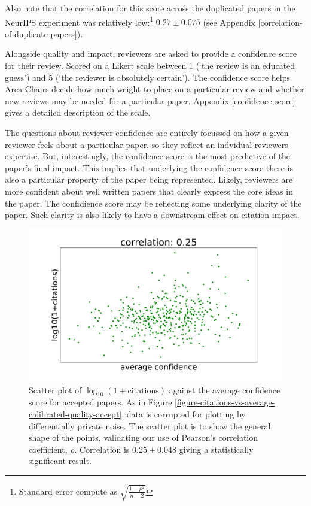 \documentclass[twoside]{article}
\begin{document}
Also note that the correlation for this score across the duplicated papers in the NeurIPS experiment was relatively low:\footnote{Standard error compute as $\sqrt{\frac{1-\rho^2}{n-2}}$} $0.27 \pm 0.075$ (see Appendix \ref{correlation-of-duplicate-papers}).

Alongside quality and impact, reviewers are asked to provide a confidence score for their review. Scored on a Likert scale between 1 (`the review is an educated guess') and 5 (`the reviewer is absolutely certain'). The confidence score helps Area Chairs decide how much weight to place on a particular review and whether new reviews may be needed for a particular paper. Appendix \ref{confidence-score} gives a detailed description of the scale.  

The questions about reviewer confidence are entirely focussed on how a given reviewer feels about a particular paper, so they reflect an indvidual reviewers expertise. But, interestingly, the confidence score is the most predictive of the paper's final impact. This implies that underlying the confidence score there is also a particular property of the paper being represented. Likely, reviewers are more confident about well written papers that clearly express the core ideas in the paper. The confidience score may be reflecting some underlying clarity of the paper. Such clarity is also likely to have a downstream effect on citation impact.

\begin{figure}[htb]
\includegraphics[width=0.9\columnwidth]{diagrams/neurips/citations-vs-average-confidence-accept.pdf}


\caption{Scatter plot of $\log_{10}(1+\text{citations})$ against the average confidence score for accepted papers. As in Figure \ref{figure-citations-vs-average-calibrated-quality-accept}, data is corrupted for plotting by differentially private noise. The scatter plot is to show the general shape of the points, validating our use of Pearson's correlation coefficient, $\rho$. Correlation is $0.25 \pm 0.048$ giving a statistically significant result.}
\label{figure-citations-vs-average-confidence-accept}
\end{figure}
\end{document}
